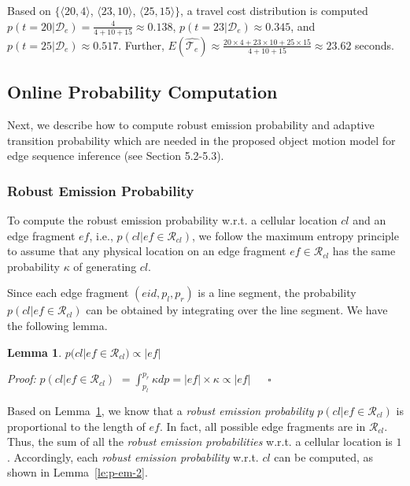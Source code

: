 \documentclass{vldb}
\newtheorem{lemma}{Lemma}
\begin{document}
	Based on $\{\langle 20,4\rangle$, $\langle 23,10\rangle$, $\langle 25,15\rangle\}$, a travel cost distribution is computed $p(t=20|\mathcal{D}_e)=\frac{4}{4+10+15}\approx 0.138$,  $p(t=23|\mathcal{D}_e)\approx 0.345$, and $p(t=25|\mathcal{D}_e)\approx 0.517$. Further, $E(\widehat{\mathcal{T}_{e}})\approx \frac{20\times 4+23\times 10+25\times 15}{4+10+15}\approx 23.62$ seconds.
	
	\subsection{Online Probability Computation}
	\label{sec:prob-comp}
	
	Next, we describe how to compute robust emission probability and adaptive transition probability which are needed in the proposed object motion model for edge sequence inference (see Section 5.2-5.3).
	
	\subsubsection{Robust Emission Probability}
	\label{sec:robust-adaptive}
	
	To compute the robust emission probability w.r.t. a cellular location $cl$ and an edge fragment $ef$, i.e., $p(cl|ef\in \mathcal{R}_{cl})$, we follow the maximum entropy principle to assume that any physical location on an edge fragment $ef\in \mathcal{R}_{cl}$ has the same probability $\kappa$ of generating $cl$.
	
	Since each edge fragment $( eid,p_l,p_r )$ is a line segment, the probability $p(cl|ef\in \mathcal{R}_{cl})$ can be obtained by integrating over the line segment. %
	We have the following lemma.
	
	\begin{lemma}
		\label{le:p-em-1}
		$p(cl|ef\in \mathcal{R}_{cl})\propto |ef|$
	\end{lemma}
	
	\textit{Proof: } 
	$p(cl|ef\in \mathcal{R}_{cl})$
	$=\int_{p_l}^{p_r} \kappa dp=|ef|\times\kappa\propto |ef|~~~~~~~\square$
	
	Based on Lemma~\ref{le:p-em-1}, we know that a {\em robust emission probability} $p(cl|ef\in \mathcal{R}_{cl})$ is proportional to the length of $ef$.
	In fact, all possible edge fragments are in $\mathcal{R}_{cl}$.
	Thus, the sum of all the {\em robust emission probabilities} w.r.t. a cellular location is $1$.
	Accordingly, each {\em robust emission probability} w.r.t. $cl$ can be computed, as shown in Lemma~\ref{le:p-em-2}.
	
\end{document}
